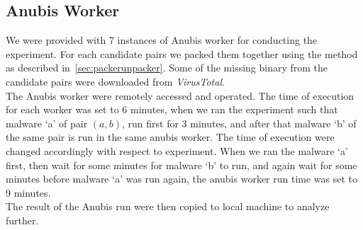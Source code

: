 \subsection{Anubis Worker}
\label{sub:Anubis Worker}
We were provided with 7 instances of Anubis worker for conducting the experiment.
For each candidate pairs we packed them together using the method as described in~\ref{sec:packerunpacker}.
Some of the missing binary from the candidate pairs were downloaded from \emph{VirusTotal}.\\
The Anubis worker were remotely accessed and operated. The time of execution for each worker was set to 6 minutes, when we ran the experiment such that malware `a' of pair $(a,b)$, run first for 3 minutes, and after that malware `b' of the same pair is run in the same anubis worker.
The time of execution were changed accordingly with respect to experiment.
When we ran the malware `a' first, then wait for some minutes for malware `b' to run, and again wait for some minutes before malware `a' was run again, the anubis worker run time was set to 9 minutes.
\\
The result of the Anubis run were then copied to local machine to analyze further.
